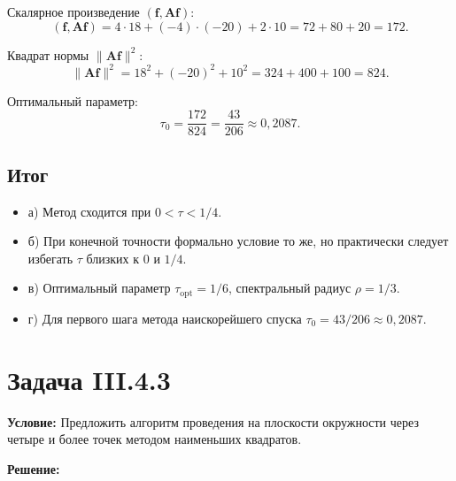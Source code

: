\documentclass{article}
\begin{document}
Скалярное произведение $(\mathbf{f}, \mathbf{A}\mathbf{f})$:
\begin{equation}
(\mathbf{f}, \mathbf{A}\mathbf{f}) = 4 \cdot 18 + (-4) \cdot (-20) + 2 \cdot 10 = 72 + 80 + 20 = 172.
\end{equation}

Квадрат нормы $\|\mathbf{A}\mathbf{f}\|^2$:
\begin{equation}
\|\mathbf{A}\mathbf{f}\|^2 = 18^2 + (-20)^2 + 10^2 = 324 + 400 + 100 = 824.
\end{equation}

Оптимальный параметр:
\begin{equation}
\boxed{\tau_0 = \frac{172}{824} = \frac{43}{206} \approx 0,2087.}
\end{equation}

\subsection*{Итог}

\begin{itemize}
\item а) Метод сходится при $0 < \tau < 1/4$.
\item б) При конечной точности формально условие то же, но практически следует избегать $\tau$ близких к 0 и $1/4$.
\item в) Оптимальный параметр $\tau_{\text{opt}} = 1/6$, спектральный радиус $\rho = 1/3$.
\item г) Для первого шага метода наискорейшего спуска $\tau_0 = 43/206 \approx 0,2087$.
\end{itemize}






















\section*{Задача III.4.3}

\textbf{Условие:} Предложить алгоритм проведения на плоскости окружности через четыре и более точек методом наименьших квадратов.

\vspace{0.5cm}
\textbf{Решение:}
\end{document}
